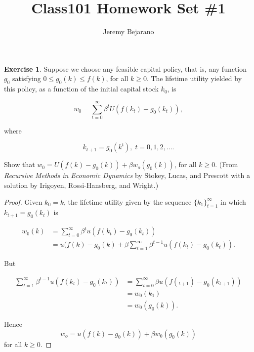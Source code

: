 \documentclass{amsart}
\begin{document}
\theoremstyle{definition}
\newtheorem{exercise}{Exercise}
\newcommand{\newproblem}[2]{
\setcounter{exercise}{#1}\addtocounter{exercise}{
    -1}\begin{exercise}#2\end{exercise}
    }
\newcommand{\setcontext}[2]{\setcounter{chapter}{#1}\setcounter{section}{#2}}
\newcommand{\s}[1]{\mathcal{#1}}
\newcommand{\R}{\mathbb{R}}
\newcommand{\N}{\mathbb{N}}
\newcommand{\F}{\mathbb{F}}
\newcommand{\C}{\mathbb{C}}
\renewcommand{\labelenumi}{(\alph{enumi})}


\title{Class101 Homework Set \#1}
\author{Jeremy Bejarano}
\maketitle


\newproblem{1}{

Suppose we choose any feasible capital policy, that is, any
function $g_0$ satisfying $0 \leq g_0(k) \leq f(k)$, for all $ k\geq 0$. The
lifetime utility yielded by this policy, as a function of the initial capital
stock $k_0$, is

\[ w_0 = \sum_{t=0}^{\infty} \beta^t U(f(k_t) - g_0(k_t)), \]

where

\[ k_{t+1} = g_0(k^t), \; t=0,1,2,....\]

Show that $w_0 = U(f(k) - g_0(k)) + \beta w_o(g_0(k))$, for all $k \geq 0.$
(From \emph{Recursive Methods in Economic Dynamics} by Stokey, Lucas, and
Prescott with a  solution by Irigoyen, Rossi-Hansberg, and Wright.) 
}
    \begin{proof}     

    Given $k_0 = k$, the lifetime utility given by the sequence
    $\{k_1\}_{t=1}^{\infty}$ in which $k_{t+1} = g_0(k_t)$ is

    \begin{align*}
    w_0(k)  &= \sum_{t=0}^{\infty}\beta^t u(f(k_t) - g_0(k_t)) \\
            &= u(f(k) - g_0(k) + \beta \sum_{t=1}^{\infty} \beta^{t-1} u(f(k_t) - g_0(k_t)).
    \end{align*}

    But

    \begin{align*}
    \sum_{t=1}^{\infty} \beta^{t-1} u(f(k_t) - g_0(k_t)) &= \sum_{t=0}^{\infty} \beta u(f(_{t+1}) - g_0(k_{t+1})) \\
            &= w_0(k_1) \\
        &= w_0(g_0(k)).
    \end{align*}

    Hence
    \[ w_o = u(f(k) - g_0(k)) + \beta w_0(g_0(k)) \]
    for all $k \geq 0$.

    \end{proof}
\end{document}
